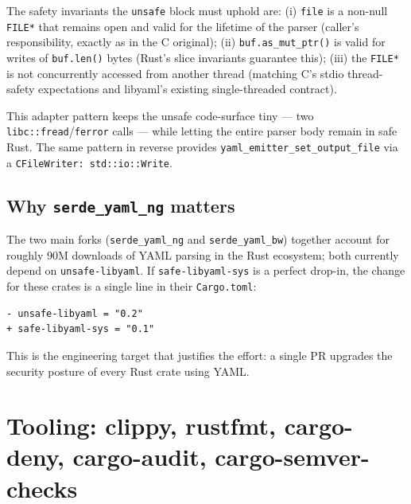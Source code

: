 \documentclass[12pt]{article}
\theoremstyle{definition}
\theoremstyle{remark}
\begin{document}
The safety invariants the \texttt{unsafe} block must uphold are:
(i) \texttt{file} is a non-null \texttt{FILE*} that remains open and valid
for the lifetime of the parser (caller's responsibility, exactly as in
the C original);
(ii) \texttt{buf.as\_mut\_ptr()} is valid for writes of \texttt{buf.len()}
bytes (Rust's slice invariants guarantee this);
(iii) the \texttt{FILE*} is not concurrently accessed from another thread
(matching C's stdio thread-safety expectations and libyaml's existing
single-threaded contract).

This adapter pattern keeps the unsafe code-surface tiny --- two
\texttt{libc::fread}/\texttt{ferror} calls --- while letting the entire
parser body remain in safe Rust. The same pattern in reverse provides
\texttt{yaml\_emitter\_set\_output\_file} via a \texttt{CFileWriter:
std::io::Write}.

\subsection{\texorpdfstring{Why \texttt{serde\_yaml\_ng} matters}{Why serde\_yaml\_ng matters}}

The two main forks (\texttt{serde\_yaml\_\allowbreak ng} and
\texttt{serde\_yaml\_\allowbreak bw}) together account for roughly 90M
downloads of YAML parsing in the Rust ecosystem; both currently depend
on \texttt{unsafe-libyaml}. If \texttt{safe-libyaml-sys} is a perfect
drop-in, the change for these crates is a single line in their
\texttt{Cargo.toml}:

\begin{lstlisting}[language={}]
- unsafe-libyaml = "0.2"
+ safe-libyaml-sys = "0.1"
\end{lstlisting}

This is the engineering target that justifies the effort: a single PR
upgrades the security posture of every Rust crate using YAML.

\section{Tooling: clippy, rustfmt, cargo-deny, cargo-audit, cargo-semver-checks}
\label{sec:tooling}
\end{document}
